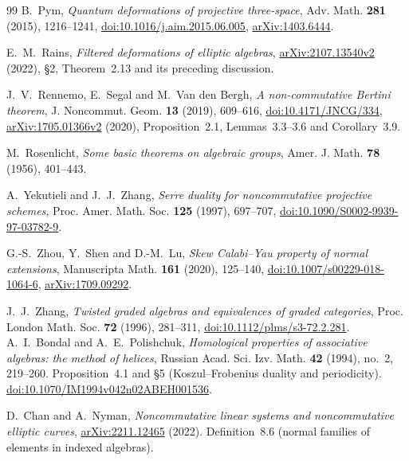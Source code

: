 \documentclass[11pt,a4paper]{ltjsarticle}
\numberwithin{equation}{section}
\begin{document}
\begin{thebibliography}{99}
B.~Pym,
\textit{Quantum deformations of projective three-space},
Adv. Math. \textbf{281} (2015), 1216--1241,
\href{https://doi.org/10.1016/j.aim.2015.06.005}{doi:10.1016/j.aim.2015.06.005},
\href{https://arxiv.org/abs/1403.6444}{arXiv:1403.6444}.

E.~M.~Rains,
\textit{Filtered deformations of elliptic algebras},
\href{https://arxiv.org/abs/2107.13540v2}{arXiv:2107.13540v2} (2022),
\S2, Theorem~2.13 and its preceding discussion.

J.~V.~Rennemo, E.~Segal and M.~Van den Bergh,
\textit{A non-commutative Bertini theorem},
J. Noncommut. Geom. \textbf{13} (2019), 609--616,
\href{https://doi.org/10.4171/JNCG/334}{doi:10.4171/JNCG/334},
\href{https://arxiv.org/abs/1705.01366v2}{arXiv:1705.01366v2} (2020),
Proposition~2.1, Lemmas~3.3--3.6 and Corollary~3.9.

M.~Rosenlicht,
\textit{Some basic theorems on algebraic groups},
Amer. J. Math. \textbf{78} (1956), 401--443.

A.~Yekutieli and J.~J.~Zhang,
\textit{Serre duality for noncommutative projective schemes},
Proc. Amer. Math. Soc. \textbf{125} (1997), 697--707,
\href{https://doi.org/10.1090/S0002-9939-97-03782-9}{doi:10.1090/S0002-9939-97-03782-9}.

G.-S.~Zhou, Y.~Shen and D.-M.~Lu,
\textit{Skew Calabi--Yau property of normal extensions},
Manuscripta Math. \textbf{161} (2020), 125--140,
\href{https://doi.org/10.1007/s00229-018-1064-6}{doi:10.1007/s00229-018-1064-6},
\href{https://arxiv.org/abs/1709.09292}{arXiv:1709.09292}.

J.~J.~Zhang,
\textit{Twisted graded algebras and equivalences of graded categories},
Proc. London Math. Soc. \textbf{72} (1996), 281--311,
\href{https://doi.org/10.1112/plms/s3-72.2.281}{doi:10.1112/plms/s3-72.2.281}.
A.~I.~Bondal and A.~E.~Polishchuk,
\emph{Homological properties of associative algebras: the method of helices},
Russian Acad. Sci. Izv. Math. \textbf{42} (1994), no.~2, 219--260.
Proposition~4.1 and \S5 (Koszul--Frobenius duality and periodicity).
\href{https://doi.org/10.1070/IM1994v042n02ABEH001536}
{doi:10.1070/IM1994v042n02ABEH001536}.

D.~Chan and A.~Nyman,
\emph{Noncommutative linear systems and noncommutative elliptic curves},
\href{https://arxiv.org/abs/2211.12465}{arXiv:2211.12465} (2022).
Definition~8.6 (normal families of elements in indexed algebras).


\end{thebibliography}
\end{document}
